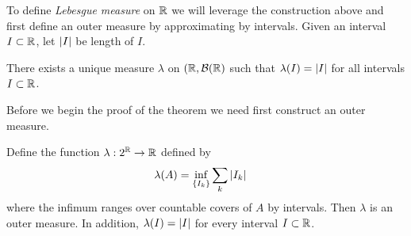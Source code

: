 To define \emph{Lebesgue measure} on $\mathbb{R}$ we will leverage the
construction above and first define an outer measure by approximating
by intervals.  Given an interval $I \subset \mathbb{R}$, let $\left \vert I \right \vert$ be
length of $I$.
\begin{thm}\label{LebesgueMeasure}There exists a
  unique measure $\lambda$ on $(\mathbb{R}, \mathcal{B}(\mathbb{R})$ such that
  $\lambda(I) = \left \vert I \right \vert$ for all intervals $I \subset \mathbb{R}$.
\end{thm}
Before we begin the proof of the theorem we need first construct an
outer measure.
\begin{lem}\label{LebesgueOuterMeasure}Define the function $\lambda : 2^{\mathbb{R}} \to \mathbb{R}$ defined by 
\begin{align*}
\lambda(A) &= \inf_{\{I_k\}} \sum_k \left \vert I_k \right \vert 
\end{align*}
where the infimum ranges over countable covers of $A$ by intervals.
Then $\lambda$ is
an outer measure.  In addition, $\lambda(I) = \left \vert I \right \vert$ for every
interval $I \subset \mathbb{R}$.
\end{lem}
